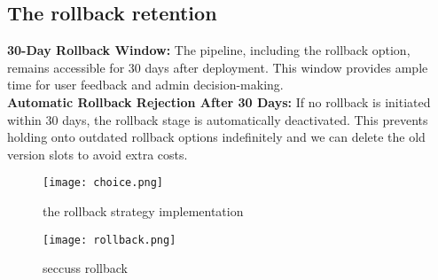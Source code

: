 \subsection{The rollback retention}
\textbf{30-Day Rollback Window:}
The pipeline, including the rollback option, remains accessible for 30 days after deployment. This window provides ample time for user feedback and admin decision-making.
\\ \noindent
\textbf{Automatic Rollback Rejection After 30 Days:}
If no rollback is initiated within 30 days, the rollback stage is automatically deactivated. This prevents holding onto outdated rollback options indefinitely and we can delete the old version slots to avoid extra costs.
\\
\begin{figure}[htbp]
    \centering
    \texttt{[image: choice.png]}
    \caption{the rollback strategy implementation}
    \label{fig:rollback-strategy}
\end{figure}

\begin{figure}[htbp]
    \centering
    \texttt{[image: rollback.png]}
    \caption{seccuss rollback}
    \label{fig:rollback-seccuss}
\end{figure}

